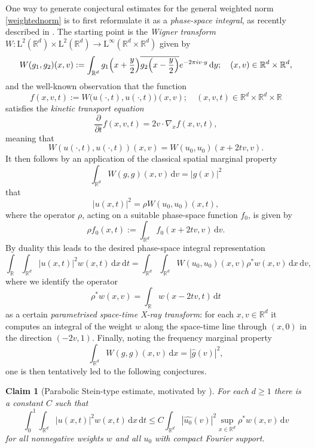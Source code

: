 \documentclass[11pt,reqno]{amsart}
\newtheorem*{claim}{Claim}
\numberwithin{equation}{section}
\newcommand{\dd}{\,\mathrm{d}}
\renewcommand{\le}{\leqslant}
\renewcommand{\geq}{\geqslant}
\begin{document}
One way to generate conjectural estimates for the general weighted norm \eqref{weightednorm} is to first reformulate it as a \textit{phase-space integral}, as recently described in \cite{DMV, BGNO}. The starting point is the \emph{Wigner transform} $W\colon \mathrm{L}^2(\mathbb{R}^d)\times \mathrm{L}^2(\mathbb{R}^d)\rightarrow \mathrm{L}^\infty(\mathbb{R}^d\times\mathbb{R}^d)$ given by
\begin{equation}\label{eucwig}
W(g_1,g_2)(x,v):=\int_{\mathbb{R}^d}g_1\Bigl(x+\frac{y}{2}\Bigr)\overline{g_2\Bigl(x-\frac{y}{2}\Bigr)} e^{-2\pi i v\cdot y}\dd y; \quad (x,v)\in\mathbb{R}^d\times\mathbb{R}^d,
\end{equation} 
and the well-known observation \cite{Wigner} that the function 
\[ f(x,v,t) := W\bigl(u(\cdot,t), u(\cdot,t)\bigr)(x,v); \quad (x,v,t)\in\mathbb{R}^d\times\mathbb{R}^d\times\mathbb{R} \]
satisfies the \emph{kinetic transport equation} 
\begin{equation}\label{kineuc}
\frac{\partial}{\partial t}f(x,v,t) = 2v\cdot\nabla_x f(x,v,t),
\end{equation}
meaning that 
\[ W(u(\cdot,t), u(\cdot,t))(x,v)=W(u_0,u_0)(x+2tv,v). \]
It then follows by an application of the classical spatial marginal property
\[ \int_{\mathbb{R}^d}W(g,g)(x,v)\dd v=|g(x)|^2 \]
that
\begin{equation}\label{PSrepcont}
|u(x,t)|^2=\rho W(u_0,u_0)(x,t),
\end{equation}
where the operator $\rho$, acting on a suitable phase-space function $f_0$, is given by
\[ \rho f_0(x,t):=\int_{\mathbb{R}^d}f_0(x+2tv,v)\dd v. \]
By duality this leads to the desired phase-space integral representation
\[ \int_{\mathbb{R}}\int_{\mathbb{R}^d}|u(x,t)|^2w(x,t)\dd x\dd t=\int_{\mathbb{R}^d}\int_{\mathbb{R}^d}W(u_0,u_0)(x,v)\rho^{\ast}w(x,v)\dd x\dd v, \]
where we identify
the operator 
\[ \rho^{\ast}w(x,v)=\int_{\mathbb{R}}w(x-2tv,t)\dd t \]
as a certain \emph{parametrised space-time X-ray transform}: for each $x,v\in\mathbb{R}^d$ it computes an integral of the weight $w$ along the space-time line through $(x,0)$ in the direction $(-2v,1)$.
Finally, noting the frequency marginal property 
\[ \int_{\mathbb{R}^d}W(g,g)(x,v)\dd x=|\widehat{g}(v)|^2, \]
one is then tentatively led to the following conjectures.

\begin{claim}[{Parabolic Stein-type estimate, motivated by \cite{SteinProb}}]
For each $d\geq1$ there is a constant $C$ such that
\begin{equation}\label{eq:euc-Stein}
\int_0^1\int_{\mathbb{R}^d}|u(x,t)|^2w(x,t)\dd x\dd t
\le C\int_{\mathbb{R}^d}|\widehat{u_0}(v)|^2\sup_{x\in\mathbb{R}^d}\rho^{\ast}w(x,v)\dd v
\end{equation}
for all nonnegative weights $w$ and all $u_0$ with compact Fourier support.
\end{claim}
\end{document}
